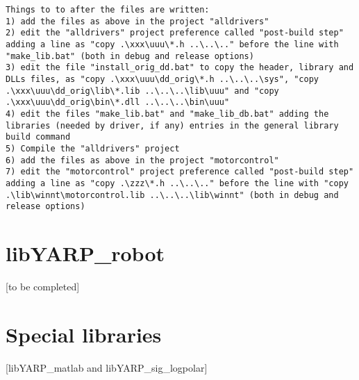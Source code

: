 \begin{verbatim}
Things to to after the files are written:
1) add the files as above in the project "alldrivers"
2) edit the "alldrivers" project preference called "post-build step" adding a line as "copy .\xxx\uuu\*.h ..\..\.." before the line with "make_lib.bat" (both in debug and release options)
3) edit the file "install_orig_dd.bat" to copy the header, library and DLLs files, as "copy .\xxx\uuu\dd_orig\*.h ..\..\..\sys", "copy .\xxx\uuu\dd_orig\lib\*.lib ..\..\..\lib\uuu" and "copy .\xxx\uuu\dd_orig\bin\*.dll ..\..\..\bin\uuu"
4) edit the files "make_lib.bat" and "make_lib_db.bat" adding the libraries (needed by driver, if any) entries in the general library build command
5) Compile the "alldrivers" project
6) add the files as above in the project "motorcontrol"
7) edit the "motorcontrol" project preference called "post-build step" adding a line as "copy .\zzz\*.h ..\..\.." before the line with "copy .\lib\winnt\motorcontrol.lib ..\..\..\lib\winnt" (both in debug and release options)

\end{verbatim}


\section{libYARP\_robot}
[to be completed]



\section{Special libraries}
[libYARP\_matlab and libYARP\_sig\_logpolar]